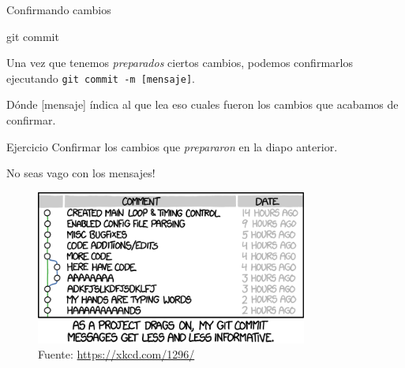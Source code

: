 \begin{frame}[t]{Confirmando cambios}

    \begin{comando}
        git commit
    \end{comando}

    \pause
    \begin{block}{}
        Una vez que tenemos \textit{preparados} ciertos cambios, podemos confirmarlos
        ejecutando \texttt{git commit -m [mensaje]}.

        \vspace{0.5em}

        Dónde [mensaje] índica al que lea eso cuales fueron los cambios que acabamos de confirmar.
    \end{block}

    \pause
    \vspace{1em}
    \begin{ejercicio}{Ejercicio}
        Confirmar los cambios que \textit{prepararon} en la diapo anterior.
    \end{ejercicio}

\end{frame}

\begin{frame}[t]{No seas vago con los mensajes!}

    \begin{figure}[ht]
        \begin{center}
            \includegraphics[height=2in]{images/xkcd-git-commit.png}
        \end{center}
        \caption{Fuente: \url{https://xkcd.com/1296/}}
    \end{figure}

\end{frame}

